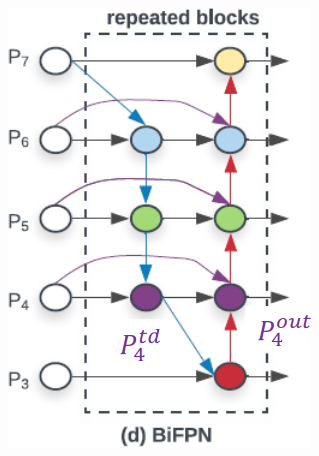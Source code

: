 \begin{subappendices}
\begin{description}
\begin{description}
\begin{itemize}
                            \begin{figure}[H]
                                \centering
                                \includegraphics[width=0.15\linewidth]{./img/bifpn.png}
                            \end{figure}
                        \end{itemize}
                \end{description}
        \end{description}
\end{subappendices}